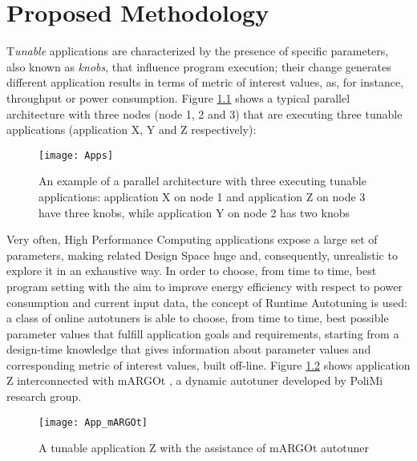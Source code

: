\chapter{Proposed Methodology}\label{methodology}

\lettrine{T}{}\textit{unable} applications are characterized by the presence of specific parameters, also known as \textit{knobs}, that influence program execution; their change generates different application results in terms of metric of interest values, as, for instance, throughput or power consumption. Figure \ref{fig::appDef} shows a typical parallel architecture with three nodes (node 1, 2 and 3) that are executing three tunable applications (application X, Y and Z respectively):

\begin{figure}[H]

    \centering
    \texttt{[image: Apps]}
    \caption[Parallel architecture with tunable applications example]{An example of a parallel architecture with three executing tunable applications: application X on node 1 and application Z on node 3 have three knobs, while application Y on node 2 has two knobs}
    \label{fig::appDef}
    
\end{figure}

Very often, High Performance Computing applications expose a large set of parameters, making related Design Space huge and, consequently, unrealistic to explore it in an exhaustive way. In order to choose, from time to time, best program setting with the aim to improve energy efficiency with respect to power consumption and current input data, the concept of Runtime Autotuning is used: a class of online autotuners is able to choose, from time to time, best possible parameter values that fulfill application goals and requirements, starting from a design-time knowledge that gives information about parameter values and corresponding metric of interest values, built off-line. Figure \ref{fig::appAut} shows application Z interconnected with mARGOt \cite{gadioli2015application}, a dynamic autotuner developed by PoliMi research group.

\begin{figure}[H]

    \centering
    \texttt{[image: App\_mARGOt]}
    \caption{A tunable application Z with the assistance of mARGOt autotuner}
    \label{fig::appAut}
    
\end{figure}


